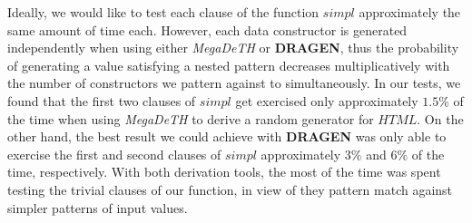 \documentclass[conference, fleqn]{IEEEtran}
\newcommand{\Conid}[1]{\mathit{#1}}
\newcommand{\Varid}[1]{\mathit{#1}}
\newcommand{\quickcheck}{\emph{QuickCheck}\xspace}
\newcommand{\megadeth}{\emph{MegaDeTH}\xspace}
\newcommand{\dragen}{\textbf{DRAGEN}\xspace}
\begin{document}
Ideally, we would like to test each clause of the function \ensuremath{\Varid{simpl}} approximately
the same amount of time each.
%
However, each data constructor is generated independently when using either
\megadeth or \dragen, thus the probability of generating a value satisfying a
nested pattern decreases multiplicatively with the number of constructors we
pattern against to simultaneously.
%
In our tests, we found that the first two clauses of \ensuremath{\Varid{simpl}} get exercised only
approximately $1.5\%$ of the time when using \megadeth to derive a random
generator for \ensuremath{\Conid{HTML}}.
%
On the other hand, the best result we could achieve with \dragen was only able
to exercise the first and second clauses of \ensuremath{\Varid{simpl}} approximately $3\%$ and
$6\%$ of the time, respectively.
%
With both derivation tools, the most of the time was spent testing the trivial
clauses of our function, in view of they pattern match against simpler patterns
of input values.





\end{document}

